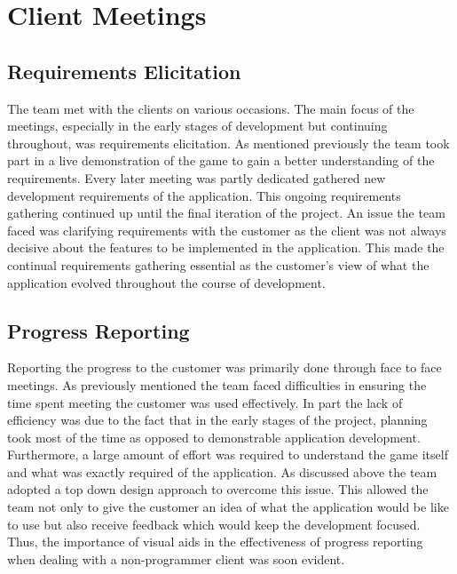 \documentclass{l3proj}
\begin{document}
\section{Client Meetings}
\label{sec:clientmeeting}
\subsection{Requirements Elicitation}
The team met with the clients on various occasions. The main focus of the meetings, especially in the early stages of development but continuing throughout, was requirements elicitation. As mentioned previously the team took part in a live demonstration of the game to gain a better understanding of the requirements. Every later meeting was partly dedicated gathered new development requirements of the application. This ongoing requirements gathering continued up until the final iteration of the project. An issue the team faced was clarifying requirements with the customer as the client was not always decisive about the features to be implemented in the application. This made the continual requirements gathering essential as the customer's view of what the application evolved throughout the course of development.

\subsection{Progress Reporting}
Reporting the progress to the customer was primarily done through face to face meetings. As previously mentioned the team faced difficulties in ensuring the time spent meeting the customer was used effectively. In part the lack of efficiency was due to the fact that in the early stages of the project, planning took most of the time as opposed to demonstrable application development. Furthermore, a large amount of effort was required to understand the game itself and what was exactly required of the application. As discussed above the team adopted a top down design approach to overcome this issue. This allowed the team not only to give the customer an idea of what the application would be like to use but also receive feedback which would keep the development focused. Thus, the importance of visual aids in the effectiveness of progress reporting when dealing with a non-programmer client was soon evident.
\end{document}
